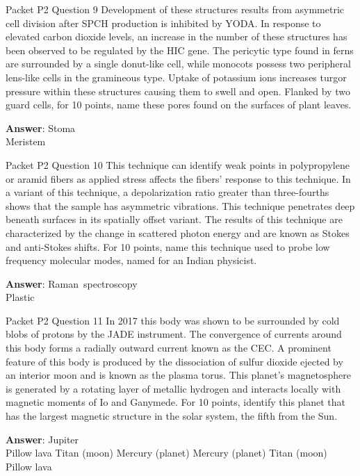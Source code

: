 \begin{frame}{Packet P2 Question 9}
Development of these structures results from asymmetric cell division after SPCH production is inhibited by YODA. In response to elevated carbon   dioxide levels, an increase in the number of these structures   has been observed   to be regulated by the HIC gene. The pericytic type found in ferns are surrounded by a single donut-like cell, while monocots possess two   peripheral lens-like cells in the gramineous type. Uptake of potassium ions increases turgor pressure   within these structures causing them to swell and open. Flanked by two guard cells, for 10 points, name these pores found on the surfaces of plant leaves.

\textbf{Answer}: Stoma\\
 Meristem
\end{frame}

\begin{frame}{Packet P2 Question 10}
This technique can identify weak points in polypropylene or aramid fibers as applied stress affects the   fibers’ response to this technique. In a variant of this technique, a depolarization ratio greater than three-fourths shows that the sample has asymmetric vibrations. This technique penetrates deep beneath surfaces in its spatially offset variant. The results of this technique are characterized by the change in scattered photon energy and   are known as Stokes and anti-Stokes shifts.     For 10 points,   name this technique used to probe low frequency molecular modes, named for an Indian physicist.

\textbf{Answer}: Raman\ spectroscopy\\
 Plastic
\end{frame}

\begin{frame}{Packet P2 Question 11}
In 2017 this body was shown to be surrounded by cold blobs of   protons by the JADE instrument. The convergence of currents around this body forms a radially outward current known as the CEC. A prominent feature of this body is produced by the   dissociation of sulfur dioxide ejected by an interior moon and is known as the plasma torus. This planet’s magnetosphere is generated by a rotating layer of metallic hydrogen and interacts locally with magnetic moments of Io and Ganymede. For 10 points, identify this planet that has the largest magnetic structure in the solar system, the     fifth from the Sun.      

\textbf{Answer}: Jupiter\\
 Pillow lava
 Titan (moon)
 Mercury (planet)
 Mercury (planet)
 Titan (moon)
 Pillow lava
\end{frame}

